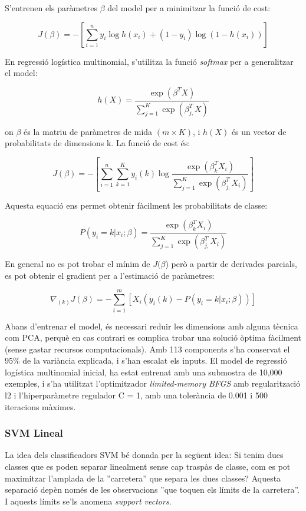 \documentclass[12pt, spanish]{article}
\begin{document}
S'entrenen els paràmetres $\beta$ del model per a minimitzar la funció de cost:

$$
J(\beta) = -[\sum^n_{i = 1} y_i \log h (x_i) + (1 - y_i) \log (1 - h(x_i))]
$$

En regressió logística multinomial, s'utilitza la funció \textit{softmax} per a generalitzar el model:

$$
h(X) = \frac{\exp(\beta^T X)}{\sum^K_{j=1} \exp(\beta_{j,}^T X)}
$$

on $\beta$ és la matriu de paràmetres de mida $(m\times K)$, i $h(X)$ és un vector de probabilitats de dimensions k. La funció de cost és:


$$
J(\beta) = - [\sum^n_{i = 1}\sum^K_{k = 1} y_{i}(k) \log\frac{\exp(\beta_k^T X_i)}{\sum^K_{j = 1}\exp(\beta_{j,}^T X_i)}]
$$

Aquesta equació ens permet obtenir fàcilment les probabilitats de classe:

$$
P(y_i = k | x_i ; \beta) =  \frac{\exp(\beta_k^T X_i)}{\sum^K_{j = 1}\exp(\beta_{j,}^T X_i)}
$$

En general no es pot trobar el mínim de $J(\beta$) però a partir de derivades parcials, es pot obtenir el gradient per a l'estimació de paràmetres:

$$
\nabla_{(k)} J(\beta) = -\sum^m_{i = 1} [X_i (y_i(k) - P(y_i = k | x_i ; \beta))]
$$

Abans d'entrenar el model, és necessari reduir les dimensions amb alguna tècnica com PCA, perquè en cas contrari es complica trobar una solució òptima fàcilment (sense gastar recursos computacionals). Amb 113 components s'ha conservat el 95\% de la variància explicada, i s'han escalat els inputs. El model de regressió logística multinomial inicial, ha estat entrenat amb una submostra de 10,000 exemples, i s'ha utilitzat l'optimitzador \textit{limited-memory BFGS} amb regularització l2 i l'hiperparàmetre regulador C = 1, amb una tolerància de 0.001 i 500 iteracions màximes.

\subsubsection{SVM Lineal}

La idea dels classificadors SVM bé donada per la següent idea: Si tenim dues classes que es poden separar linealment sense cap traspàs de classe, com es pot maximitzar l'amplada de la ''carretera'' que separa les dues classes? Aquesta separació depèn només de les observacions ''que toquen els límits de la carretera''. I aquests límits se'ls anomena \textit{support vectors}.
\end{document}
